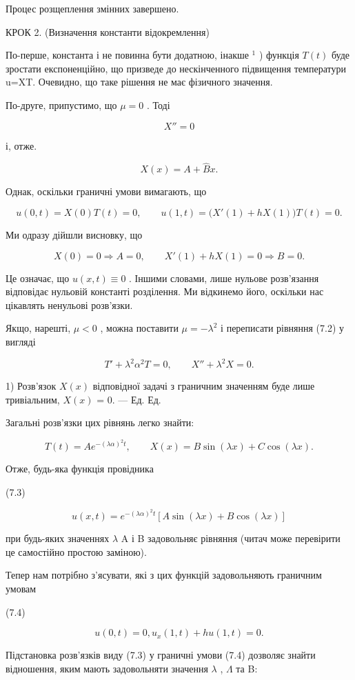 \documentclass[
  ukrainian,
]{article}
\begin{document}
Процес розщеплення змінних завершено.

КРОК 2. (Визначення константи відокремлення)

По-перше, константа і не повинна бути додатною, інакше \(^{1}\) )
функція \(T\left( t\right)\) буде зростати експоненційно, що призведе до
нескінченного підвищення температури u=XT. Очевидно, що таке рішення не
має фізичного значення.

По-друге, припустимо, що \(\mu = 0\) . Тоді

\[
X'' = 0
\]

і, отже.

\[
X(x) = A + \hat{B}x.
\]

Однак, оскільки граничні умови вимагають, що

\[
u(0, t) = X(0) T(t) = 0, \qquad u(1,t)=\bigl(X'(1)+hX(1)\bigr)T(t)=0.
\]

Ми одразу дійшли висновку, що

\[
X(0)=0\Rightarrow A=0,\qquad X'(1)+hX(1)=0\Rightarrow B=0.
\]

Це означає, що \(u(x, t) \equiv 0\) . Іншими словами, лише нульове
розв'язання відповідає нульовій константі розділення. Ми відкинемо його,
оскільки нас цікавлять ненульові розв'язки.

Якщо, нарешті, \(\mu < 0\) , можна поставити \(\mu = -\lambda^2\) і
переписати рівняння (7.2) у вигляді

\[
T' + \lambda^2 \alpha^2 T = 0, \qquad X'' + \lambda^2 X = 0.
\]

1) Розв'язок \(X(x)\) відповідної задачі з граничним значенням буде лише
тривіальним, \(X(x)\) = 0. --- Ед. Ед.

Загальні розв'язки цих рівнянь легко знайти:

\[
T(t) = Ae^{-(\lambda \alpha)^2 t},
\qquad X(x) = B\sin(\lambda x) + C\cos(\lambda x).
\]

Отже, будь-яка функція провідника

(7.3)

\[
u(x, t) = e^{-(\lambda \alpha)^2 t} [A \sin(\lambda x) + B \cos(\lambda x)]
\]

при будь-яких значеннях \(\lambda\) A і B задовольняє рівняння (читач
може перевірити це самостійно простою заміною).

Тепер нам потрібно з'ясувати, які з цих функцій задовольняють граничним
умовам

(7.4)

\[
u(0, t) = 0, u_x(1, t) + hu(1, t) = 0.
\]

Підстановка розв'язків виду (7.3) у граничні умови (7.4) дозволяє знайти
відношення, яким мають задовольняти значення \(\lambda\) , \(\Lambda\)
та B:
\end{document}
